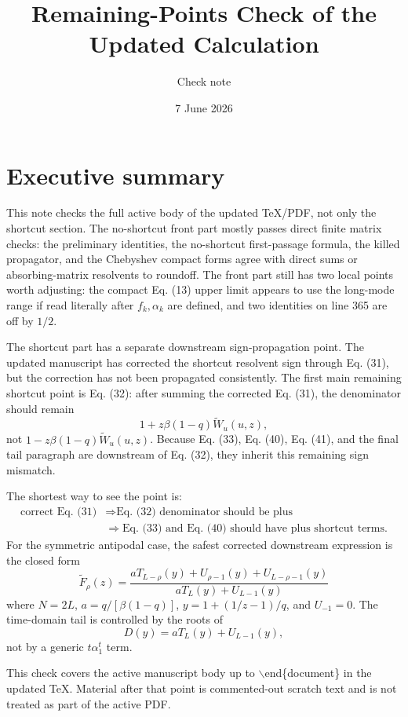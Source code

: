\documentclass[11pt]{article}
\title{Remaining-Points Check of the Updated Calculation}
\author{Check note}
\date{7 June 2026}
\newcommand{\wt}{\widetilde}
\begin{document}
\maketitle

\section*{Executive summary}

This note checks the full active body of the updated TeX/PDF, not only
the shortcut section.  The no-shortcut front part mostly passes direct finite
matrix checks: the preliminary identities, the no-shortcut first-passage
formula, the killed propagator, and the Chebyshev compact forms agree with
direct sums or absorbing-matrix resolvents to roundoff.  The front part still
has two local points worth adjusting: the compact Eq. (13) upper limit appears
to use the long-mode range if read literally after \(f_k,\alpha_k\) are
defined, and two identities on line 365 are off by \(1/2\).

The shortcut part has a separate downstream sign-propagation point.  The
updated manuscript has corrected the shortcut resolvent sign through Eq. (31),
but the correction has not been propagated consistently.  The first main
remaining shortcut point is Eq. (32): after summing the corrected Eq. (31), the
denominator should remain
\[
  1+z\beta(1-q)\wt W_u(u,z),
\]
not \(1-z\beta(1-q)\wt W_u(u,z)\).  Because Eq. (33), Eq. (40), Eq. (41),
and the final tail paragraph are downstream of Eq. (32), they inherit this
remaining sign mismatch.

The shortest way to see the point is:
\begin{align*}
\boxed{\text{correct Eq. (31)}} &\Longrightarrow
\boxed{\text{Eq. (32) denominator should be plus}}\\
&\Longrightarrow
\boxed{\text{Eq. (33) and Eq. (40) should have plus shortcut terms}}.
\end{align*}
For the symmetric antipodal case, the safest corrected downstream expression is
the closed form
\[
\boxed{
  \wt F_\rho(z)=
  \frac{aT_{L-\rho}(y)+U_{\rho-1}(y)+U_{L-\rho-1}(y)}
  {aT_L(y)+U_{L-1}(y)}
}
\]
where \(N=2L\), \(a=q/[\beta(1-q)]\), \(y=1+(1/z-1)/q\), and \(U_{-1}=0\).
The time-domain tail is controlled by the roots of
\[
  D(y)=aT_L(y)+U_{L-1}(y),
\]
not by a generic \(t\alpha_1^t\) term.

This check covers the active manuscript body up to \(\backslash\)end\{document\}
in the updated TeX.  Material after that point is commented-out scratch text and
is not treated as part of the active PDF.
\end{document}
